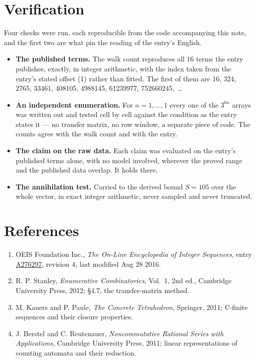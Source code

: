 \documentclass[11pt]{article}
\theoremstyle{definition}
\begin{document}
\section{Verification}

Four checks were run, each reproducible from the code accompanying this note, and the first two are what pin the reading of the entry's English.

\begin{itemize}

\item {\bfseries The published terms.} The walk count reproduces all 16 terms the entry publishes, exactly, in integer arithmetic, with the index taken from the entry's stated offset (1) rather than fitted. The first of them are 16, 324, 2765, 33461, 408105, 4988145, 61239977, 752660245,~\dots

\item {\bfseries An independent enumeration.} For $n = 1,\dots,1$ every one of the $3^{6n}$ arrays was written out and tested cell by cell against the condition as the entry states it --- no transfer matrix, no row window, a separate piece of code. The counts agree with the walk count and with the entry.

\item {\bfseries The claim on the raw data.} Each claim was evaluated on the entry's published terms alone, with no model involved, wherever the proved range and the published data overlap. It holds there.

\item {\bfseries The annihilation test.} Carried to the derived bound $S = 105$ over the whole vector, in exact integer arithmetic, never sampled and never truncated.

\end{itemize}

\section{References}

\begin{enumerate}

\item OEIS Foundation Inc., \emph{The On-Line Encyclopedia of Integer Sequences}, entry \href{https://oeis.org/A276297}{A276297}, revision 4, last modified Aug 28 2016.

\item R. P. Stanley, \emph{Enumerative Combinatorics}, Vol.~1, 2nd ed., Cambridge University Press, 2012; \S4.7, the transfer-matrix method.

\item M. Kauers and P. Paule, \emph{The Concrete Tetrahedron}, Springer, 2011; C-finite sequences and their closure properties.

\item J. Berstel and C. Reutenauer, \emph{Noncommutative Rational Series with Applications}, Cambridge University Press, 2011; linear representations of counting automata and their reduction.

\end{enumerate}
\end{document}
